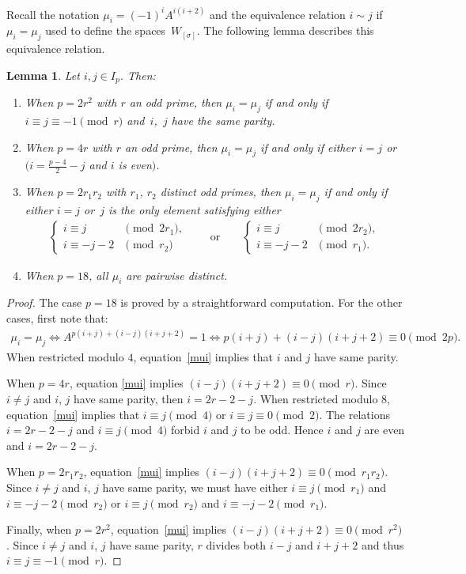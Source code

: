 \documentclass[pdftex]{sigma}
\numberwithin{equation}{section}
\newtheorem{Lemma}[Theorem]{Lemma}
\begin{document}
Recall the notation $\mu_i=(-1)^iA^{i(i+2)}$ and the equivalence relation $i\sim j$ if $\mu_i=\mu_j$ used to define the spaces~$W_{[\sigma]}$. The following lemma describes this equivalence relation.
\begin{Lemma}\label{lemmachoucroute} Let $i,j\in I_p$. Then:
\begin{enumerate}\itemsep=0pt
\item[$1.$] When $p=2r^2$ with $r$ an odd prime, then $\mu_i=\mu_j$ if and only if $i\equiv j\equiv -1\pmod{r}$ and~$i$,~$j$ have the same parity.
\item[$2.$] When $p=4r$ with $r$ an odd prime, then $\mu_i=\mu_j$ if and only if either $i=j$ or $(i=\frac{p-4}{2} - j$ and $i$ is even$)$.
\item[$3.$] When $p=2r_1r_2$ with $r_1$, $r_2$ distinct odd primes, then $\mu_i=\mu_j$ if and only if either $i=j$ or~$j$ is the only element satisfying either
\begin{gather*} \begin{cases}
i\equiv j & \pmod{2r_1}, \\
i\equiv -j-2 & \pmod{r_2}
\end{cases}
\qquad \text{or}\qquad
 \begin{cases}
i\equiv j & \pmod{2r_2}, \\
i\equiv -j-2 & \pmod{r_1}.
\end{cases}
\end{gather*}
\item[$4.$] When $p=18$, all $\mu_i$ are pairwise distinct.
 \end{enumerate}
\end{Lemma}

\begin{proof}The case $p=18$ is proved by a straightforward computation. For the other cases, first note that:
\begin{gather}\label{mui}
 \mu_i=\mu_j \Leftrightarrow A^{p(i+j)+(i-j)(i+j+2)}=1 \Leftrightarrow p(i+j)+(i-j)(i+j+2)\equiv 0 \pmod{2p}.
\end{gather}
When restricted modulo $4$, equation~\eqref{mui} implies that $i$ and $j$ have same parity.

When $p=4r$, equation \eqref{mui} implies $(i-j)(i+j+2)\equiv 0 \pmod{r}$. Since $i\neq j$ and $i$, $j$ have same parity, then $i=2r-2-j$. When restricted modulo $8$, equation~\eqref{mui} implies that $i\equiv j\pmod{4}$ or $i\equiv j \equiv 0 \pmod{2}$. The relations $i=2r-2-j$ and $i\equiv j \pmod{4}$ forbid $i$ and $j$ to be odd. Hence $i$ and $j$ are even and $i=2r-2-j$.

When $p=2r_1r_2$, equation~\eqref{mui} implies $(i-j)(i+j+2) \equiv 0\pmod{r_1r_2}$. Since $i\neq j$ and $i$, $j$ have same parity, we must have either $i\equiv j \pmod{r_1}$ and $i\equiv -j-2 \pmod{r_2}$ or $i\equiv j \pmod{r_2}$ and $i\equiv -j-2 \pmod{r_1}$.

Finally, when $p=2r^2$, equation~\eqref{mui} implies $(i-j)(i+j+2) \equiv 0\pmod{r^2}$. Since $i\neq j$ and $i$, $j$ have same parity, $r$ divides both $i-j$ and $i+j+2$ and thus $i\equiv j \equiv -1 \pmod{r}$.
\end{proof}
\end{document}
